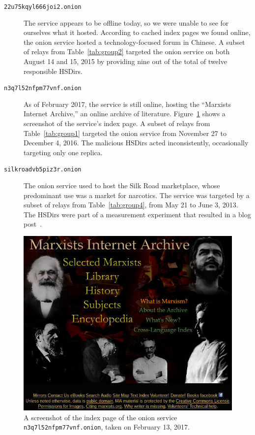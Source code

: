 \begin{description}
	\item[\texttt{22u75kqyl666joi2.onion}] The service appears to be offline
		today, so we were unable to see for ourselves what it hosted.  According
		to cached index pages we found online, the onion service hosted a
		technology-focused forum in Chinese.  A subset of relays from
		Table~\ref{tab:group2} targeted the onion service on both August 14 and
		15, 2015 by providing nine out of the total of twelve responsible
		HSDirs.

	\item[\texttt{n3q7l52nfpm77vnf.onion}] As of February 2017, the service is
		still online, hosting the ``Marxists Internet Archive,'' an online
		archive of literature.  Figure~\ref{fig:archive} shows a screenshot of
		the service's index page.  A subset of relays from
		Table~\ref{tab:group1} targeted the onion service from November 27 to
		December 4, 2016.  The malicious HSDirs acted inconsistently,
		occasionally targeting only one replica.

	\item[\texttt{silkroadvb5piz3r.onion}] The onion service used to host the
		Silk Road marketplace, whose predominant use was a market for narcotics.
		The service was targeted by a subset of relays from
		Table~\ref{tab:group4}, from May 21 to June 3, 2013.  The HSDirs were
		part of a measurement experiment that resulted in a blog
		post~\cite{OCearbhaill2013a}.
\end{description}

\begin{figure}[t]
	\centering
	\includegraphics[width=\linewidth]{figures/marxists-internet-archive.jpg}
	\caption{A screenshot of the index page of the onion service
		\texttt{n3q7l52nfpm77vnf.onion}, taken on February 13, 2017.}
	\label{fig:archive}
\end{figure}
